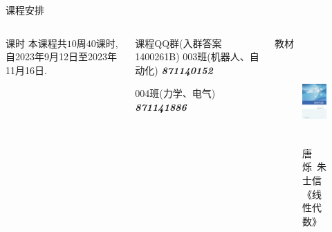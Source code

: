 \begin{frame}{课程安排}
	\onslide<+->
	\begin{columns}
			\onslide<+->
			\begin{block*}{课时}
				本课程共$10$周$40$课时, 自2023年9月12日至2023年11月16日.
			\end{block*}
			\vspace{.4\baselineskip}
			\onslide<+->
			\begin{block}{课程QQ群(入群答案 1400261B)}
				\vspace{\baselineskip}
					003班(机器人、自动化) \emph{\textbf{871140152}}
					\vspace{\baselineskip}
					
					004班(力学、电气) \emph{\textbf{871141886}}
			\end{block}
			\begin{block}{教材}
				\begin{figure}
					\includegraphics[height=32mm]{../image/book.jpg}
					\caption{唐烁\ 朱士信《线性代数》}
				\end{figure}
			\end{block}
		\end{columns}
\end{frame}


